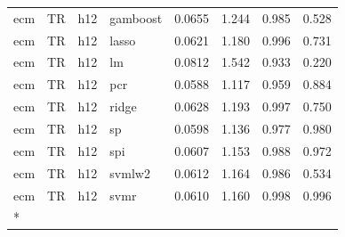 \begin{ThreePartTable}
\begin{longtable}[t]{llclcccc}
ecm & TR & h12 & gamboost & 0.0655 & 1.244 & 0.985 & 0.528\\
ecm & TR & h12 & lasso & 0.0621 & 1.180 & 0.996 & 0.731\\
ecm & TR & h12 & lm & 0.0812 & 1.542 & 0.933 & 0.220\\
ecm & TR & h12 & pcr & 0.0588 & 1.117 & 0.959 & 0.884\\
ecm & TR & h12 & ridge & 0.0628 & 1.193 & 0.997 & 0.750\\
ecm & TR & h12 & sp & 0.0598 & 1.136 & 0.977 & 0.980\\
ecm & TR & h12 & spi & 0.0607 & 1.153 & 0.988 & 0.972\\
ecm & TR & h12 & svmlw2 & 0.0612 & 1.164 & 0.986 & 0.534\\
ecm & TR & h12 & svmr & 0.0610 & 1.160 & 0.998 & 0.996\\*
\end{longtable}
\end{ThreePartTable}
\endgroup{}
